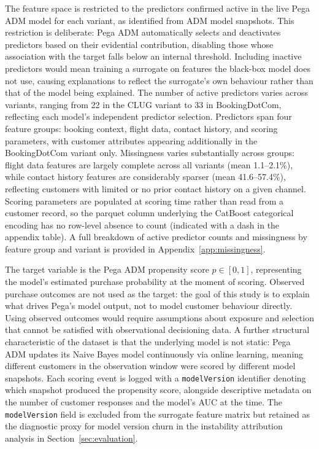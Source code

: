 \documentclass[oneside]{memoir} %
\begin{document}
The feature space is restricted to the predictors confirmed active in the live Pega ADM model for each variant, as identified from ADM model snapshots. This restriction is deliberate: Pega ADM automatically selects and deactivates predictors based on their evidential contribution, disabling those whose association with the target falls below an internal threshold. Including inactive predictors would mean training a surrogate on features the black-box model does not use, causing explanations to reflect the surrogate's own behaviour rather than that of the model being explained. The number of active predictors varies across variants, ranging from 22 in the CLUG variant to 33 in BookingDotCom, reflecting each model's independent predictor selection. Predictors span four feature groups: booking context, flight data, contact history, and scoring parameters, with customer attributes appearing additionally in the BookingDotCom variant only. Missingness varies substantially across groups: flight data features are largely complete across all variants (mean 1.1--2.1\%), while contact history features are considerably sparser (mean 41.6--57.4\%), reflecting customers with limited or no prior contact history on a given channel. Scoring parameters are populated at scoring time rather than read from a customer record, so the parquet column underlying the CatBoost categorical encoding has no row-level absence to count (indicated with a dash in the appendix table). A full breakdown of active predictor counts and missingness by feature group and variant is provided in Appendix~\ref{app:missingness}.

The target variable is the Pega ADM propensity score $p \in [0,1]$, representing the model's estimated purchase probability at the moment of scoring. Observed purchase outcomes are not used as the target: the goal of this study is to explain what drives Pega's model output, not to model customer behaviour directly. Using observed outcomes would require assumptions about exposure and selection that cannot be satisfied with observational decisioning data. A further structural characteristic of the dataset is that the underlying model is not static: Pega ADM updates its Naive Bayes model continuously via online learning, meaning different customers in the observation window were scored by different model snapshots. Each scoring event is logged with a \texttt{modelVersion} identifier denoting which snapshot produced the propensity score, alongside descriptive metadata on the number of customer responses and the model's AUC at the time. The \texttt{modelVersion} field is excluded from the surrogate feature matrix but retained as the diagnostic proxy for model version churn in the instability attribution analysis in Section~\ref{sec:evaluation}.
\end{document}
